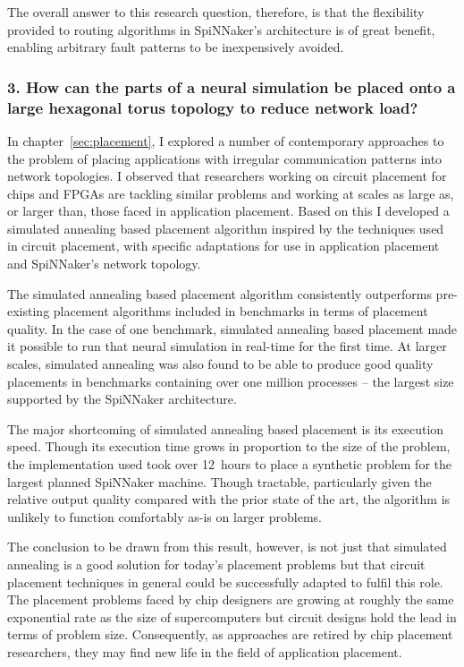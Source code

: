		The overall answer to this research question, therefore, is that the
		flexibility provided to routing algorithms in SpiNNaker's architecture is
		of great benefit, enabling arbitrary fault patterns to be inexpensively
		avoided.
		
		\subsubsection{3. How can the parts of a neural simulation be placed onto a
		large hexagonal torus topology to reduce network load?}
		
		In chapter~\ref{sec:placement}, I explored a number of contemporary
		approaches to the problem of placing applications with irregular
		communication patterns into network topologies. I observed that researchers
		working on circuit placement for chips and FPGAs are tackling similar
		problems and working at scales as large as, or larger than, those faced in
		application placement. Based on this I developed a simulated annealing
		based placement algorithm inspired by the techniques used in circuit
		placement, with specific adaptations for use in application placement and
		SpiNNaker's network topology.
		
		The simulated annealing based placement algorithm consistently outperforms
		pre-existing placement algorithms included in benchmarks in terms of
		placement quality.  In the case of one benchmark, simulated annealing based
		placement made it possible to run that neural simulation in real-time for
		the first time.  At larger scales, simulated annealing was also found to be
		able to produce good quality placements in benchmarks containing over one
		million processes -- the largest size supported by the SpiNNaker
		architecture.
		
		The major shortcoming of simulated annealing based placement is its
		execution speed. Though its execution time grows in proportion to the size
		of the problem, the implementation used took over 12~hours to place a
		synthetic problem for the largest planned SpiNNaker machine. Though
		tractable, particularly given the relative output quality compared with the
		prior state of the art, the algorithm is unlikely to function comfortably
		as-is on larger problems.
		
		The conclusion to be drawn from this result, however, is not just that
		simulated annealing is a good solution for today's placement problems but
		that circuit placement techniques in general could be successfully adapted
		to fulfil this role. The placement problems faced by chip designers are
		growing at roughly the same exponential rate as the size of supercomputers
		but circuit designs hold the lead in terms of problem size. Consequently,
		as approaches are retired by chip placement researchers, they may find new
		life in the field of application placement.
		
